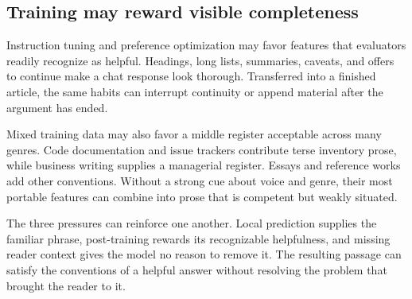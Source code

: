 \subsection{Training may reward visible completeness}

Instruction tuning and preference optimization may favor features that
evaluators readily recognize as helpful. Headings, long lists, summaries,
caveats, and offers to continue make a chat response look thorough. Transferred
into a finished article, the same habits can interrupt continuity or append
material after the argument has ended.

Mixed training data may also favor a middle register acceptable across many
genres. Code documentation and issue trackers contribute terse inventory
prose, while business writing supplies a managerial register. Essays and
reference works add other conventions. Without a strong cue about voice and
genre, their most portable features can combine into prose that is competent
but weakly situated.

The three pressures can reinforce one another. Local prediction supplies the
familiar phrase, post-training rewards its recognizable helpfulness, and
missing reader context gives the model no reason to remove it. The resulting
passage can satisfy the conventions of a helpful answer without resolving the
problem that brought the reader to it.
